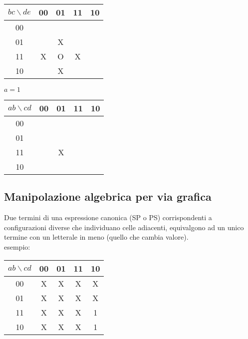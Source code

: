 \documentclass{article}
\begin{document}
\begin{itemize}
    \begin{center}
    \begin{tabular}{ |c|c|c|c|c| }
    \hline
    $bc \backslash de$ & 00 & 01 & 11 & 10 \\
    \hline
    \hline
    00 & & & & \\
    01 & & X & & \\
    11 & X & O & X & \\
    10 & & X & & \\
    \hline
    \end{tabular}
    \end{center}

    $a=1$

    \begin{center}
    \begin{tabular}{ |c|c|c|c|c| }
    \hline
    $ab \backslash cd$ & 00 & 01 & 11 & 10 \\
    \hline
    \hline
    00 & & & & \\
    01 & & & & \\
    11 & & X & & \\
    10 & & & & \\
    \hline
    \end{tabular}
    \end{center}
\end{itemize}

\subsection{Manipolazione algebrica per via grafica}

Due termini di una espressione canonica (SP o PS) corrispondenti a configurazioni diverse che individuano celle adiacenti,
equivalgono ad un unico termine con un letterale in meno (quello che cambia valore).\\

\noindent
esempio:

\begin{center}
\begin{tabular}{ |c|c|c|c|c| }
\hline
$ab \backslash cd$ & 00 & 01 & 11 & 10 \\
\hline
\hline
00 & X & X & X & X \\
01 & X & X & X & X \\
11 & X & X & X & 1 \\
10 & X & X & X & 1 \\
\hline
\end{tabular}
\end{center}
\end{document}
